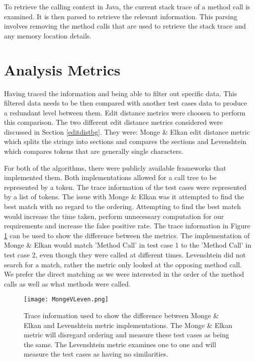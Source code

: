 To retrieve the calling context in Java, the current stack trace of a method call is examined. It is then parsed to retrieve the relevant information. This parsing involves removing the method calls that are used to retrieve the stack trace and any memory location details. 

\section{Analysis Metrics}
\label{S:metrics}
Having traced the information and being able to filter out specific data. This filtered data needs to be then compared with another test cases data to produce a redundant level between them. Edit distance metrics were choosen to perform this comparison. The two different edit distance metrics considered were discussed in Section \ref{editdistbg}. They were: Monge \& Elkan edit distance metric \cite{monge1997efficient} which splits the strings into sections and compares the sections and Levenshtein \cite{levenshtein1966binary} which compares tokens that are generally single characters. 

For both of the algorithms, there were publicly available frameworks that implemented them. Both implementations allowed for a call tree to be represented by a token. The trace information of the test cases were represented by a list of tokens. The issue with Monge \& Elkan was it attempted to find the best match with no regard to the ordering. Attempting to find the best match would increase the time taken, perform unnecessary computation for our requirements and increase the false positive rate. The trace information in Figure \ref{fig:mongevleven} can be used to show the difference between the metrics. The implementation of Monge \& Elkan would match 'Method Call' in test case 1 to the 'Method Call' in test case 2, even though they were called at different times. Levenshtein did not search for a match, rather the metric only looked at the opposing method call. We prefer the direct matching as we were interested in the order of the method calls as well as what methods were called.

\begin{figure}[h]
\begin{center}
\texttt{[image: MongeVLeven.png]}
\end{center}
\caption[Comparison between Monge \& Elkan and Levensthein]{Trace information used to show the difference between Monge \& Elkan and Levenshtein metric implementations. The Monge \& Elkan metric will disregard ordering and measure these test cases as being the same. The Levenshtein metric examines one to one and will measure the test cases as having no similarities.}
\label{fig:mongevleven}
\end{figure}


